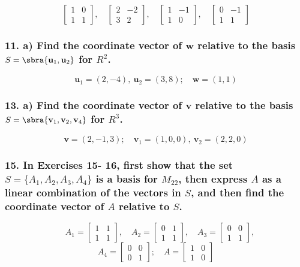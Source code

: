 \documentclass{article}
\begin{document}
\[
\begin{bmatrix} 1 & 0 \\ 1 & 1 \end{bmatrix}, \quad \begin{bmatrix} 2 & -2 \\ 3 & 2 \end{bmatrix}, \quad \begin{bmatrix} 1 & -1 \\ 1 & 0 \end{bmatrix}, \quad \begin{bmatrix} 0 & -1 \\ 1 & 1 \end{bmatrix}
\]
\vfill

\subsubsection*{ 11. a) Find the coordinate vector of $\mathbf{w}$ relative to the basis $S = \sbra{\mathbf{u}_1, \mathbf{u}_2}$ for $R^2$. }

\[\mathbf{u}_1 = (2, -4),\ \mathbf{u}_2 = (3, 8); \quad \mathbf{w} = (1, 1)\]
\vfill

\pagebreak
\subsubsection*{ 13. a) Find the coordinate vector of $\mathbf{v}$ relative to the basis $S = \sbra{\mathbf{v}_1, \mathbf{v}_2, \mathbf{v}_4}$ for $R^3$. }

\[\mathbf{v} = (2, -1, 3); \quad \mathbf{v}_1 = (1, 0, 0),\ \mathbf{v}_2 = (2, 2, 0)\]
\vfill

\subsubsection*{ 15. In Exercises 15- 16, first show that the set $S = \{A_1, A_2, A_3, A_4\}$ is a basis for $M_{22}$, then express $A$ as a linear combination of the vectors in $S$, and then find the coordinate vector of $A$ relative to $S$. }

\[\quad A_1 = \begin{bmatrix} 1 & 1 \\ 1 & 1 \end{bmatrix}, \quad A_2 = \begin{bmatrix} 0 & 1 \\ 1 & 1 \end{bmatrix}, \quad A_3 = \begin{bmatrix} 0 & 0 \\ 1 & 1 \end{bmatrix},\]
\[A_4 = \begin{bmatrix} 0 & 0 \\ 0 & 1 \end{bmatrix}; \quad A = \begin{bmatrix} 1 & 0 \\ 1 & 0 \end{bmatrix}\]
\vfill
\end{document}
